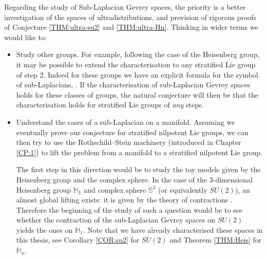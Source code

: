 \documentclass[12pt,oneside,a4paper]{book}
\numberwithin{equation}{section}     %
\theoremstyle{plain}
\theoremstyle{definition}
\newcommand{\h}{{\mathbb H}}
\begin{document}
Regarding the study of Sub-Laplacian Gevrey spaces, the priority is a better investigation of the spaces of ultradistributions, and provision of rigorous proofs of Conjecture \ref{THM:ultra-su2} and \ref{THM:ultra-Hn}. Thinking in wider terms we would like to:
\begin{itemize}
	\item Study other groups. For example, following the case of the Heisenberg group, it may be possible to extend the characterisation to any stratified Lie group of step $2$. Indeed for these groups we have an  explicit formula for the symbol of sub-Laplacians, \cite{CRS2005,BFG2016}. If the characterisation of sub-Laplacian Gevrey spaces holds for these classes of groups, the natural conjecture will then be that the characterisation holds for stratified Lie groups of \textit{any} steps.
	
	\item Understand the cases of a sub-Laplacian on a manifold. Assuming we eventually prove our conjecture for stratified nilpotent Lie groups, we can then try to use the Rothschild--Stein machinery (introduced in Chapter \ref{CP:1}) to lift the problem from a manifold to a stratified nilpotent Lie group. 
	
	The first step in this direction would be to study the toy models given by the Heisenberg group and the complex sphere. In the case of the $3$-dimensional Heisenberg group $\h_1$ and complex sphere $\mathbb{S}^3$ (or equivalently $SU(2)$), an almost global lifting exists: it is given by the theory of contractions \cite{RR1986}. Therefore the beginning of the study of such a question would be to see whether the contraction of the sub-Laplacian Gevrey spaces on $SU(2)$ yields the ones on $\h_1$. Note that we have already characterised these spaces in this thesis, see Corollary \ref{COR:su2} for $SU(2)$ and Theorem \ref{THM:Heis} for $\h_n$.
	

\end{itemize}
\end{document}
